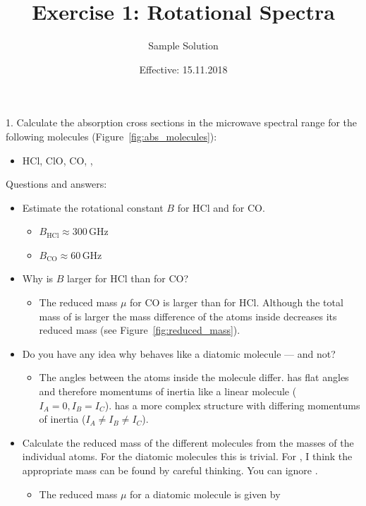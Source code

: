 \documentclass[paper=a4, fontsize=11pt]{scrartcl}
\title{Exercise 1: Rotational Spectra}
\author{Sample Solution}
\date{Effective: 15.11.2018}
\begin{document}
\maketitle

1. Calculate the absorption cross sections in the microwave spectral range for
the following molecules (Figure~\ref{fig:abs_molecules}):
\begin{itemize}
    \item HCl, ClO, CO, , 
\end{itemize}

Questions and answers:
\begin{itemize}
    \item Estimate the rotational constant $B$ for HCl and for CO.
    \begin{itemize}
      \item $B_{\mathrm{HCl}} \approx 300$\,GHz
      \item $B_{\mathrm{CO}} \approx 60$\,GHz
    \end{itemize}
    \item Why is $B$ larger for HCl than for CO?
    \begin{itemize}
        \item The reduced mass $\mu$ for CO is larger than for HCl.
            Although the total mass of  is larger the mass difference
            of the atoms inside decreases its reduced mass
            (see Figure~\ref{fig:reduced_mass}).
    \end{itemize}
    \item Do you have any idea why  behaves like a diatomic molecule
        --- and  not?
    \begin{itemize}
      \item The angles between the atoms inside the molecule differ.
             has flat angles and therefore momentums of inertia like
            a linear molecule ($I_A = 0, I_B = I_C$).  has a more
            complex structure with differing momentums of inertia ($I_A \neq
            I_B \neq I_C$).
    \end{itemize}
    \item Calculate the reduced mass of the different molecules from the masses
        of the individual atoms. For the diatomic molecules this is trivial.
        For , I think the appropriate mass can be found by careful
        thinking. You can ignore .
        \begin{itemize}
          \item The reduced mass $\mu$ for a diatomic molecule is given by

\end{itemize}
\end{itemize}
\end{document}
